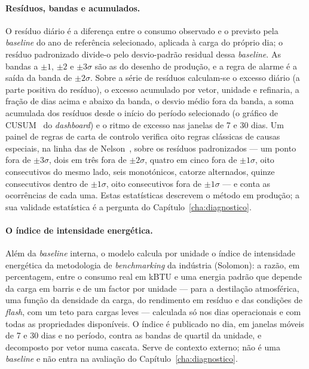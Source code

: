 \paragraph{Resíduos, bandas e acumulados.} O resíduo diário é a diferença
entre o consumo observado e o previsto pela \emph{baseline} do ano de
referência selecionado, aplicada à carga do próprio dia; o resíduo
padronizado divide-o pelo desvio-padrão residual dessa \emph{baseline}. As
bandas a $\pm1$, $\pm2$ e $\pm3\sigma$ são as do desenho de produção, e a
regra de alarme é a saída da banda de $\pm2\sigma$. Sobre a série de
resíduos calculam-se o excesso diário (a parte positiva do resíduo), o
excesso acumulado por vetor, unidade e refinaria, a fração de dias acima
e abaixo da banda, o desvio médio fora da banda, a soma acumulada dos
resíduos desde o início do período selecionado (o gráfico de CUSUM~\cite{Page1954} do
\emph{dashboard}) e o ritmo de excesso nas janelas de 7 e 30 dias. Um
painel de regras de carta de controlo verifica oito regras clássicas de
causas especiais, na linha das de Nelson~\cite{Nelson1984}, sobre os resíduos padronizados --- um ponto fora de $\pm3\sigma$, dois em
três fora de $\pm2\sigma$, quatro em cinco fora de $\pm1\sigma$, oito
consecutivos do mesmo lado, seis monotónicos, catorze alternados, quinze
consecutivos dentro de $\pm1\sigma$, oito consecutivos fora de
$\pm1\sigma$ --- e conta as ocorrências de cada uma. Estas estatísticas
descrevem o método em produção; a sua validade estatística é a pergunta
do Capítulo~\ref{cha:diagnostico}.

\paragraph{O índice de intensidade energética.} Além da \emph{baseline}
interna, o modelo calcula por unidade o índice de intensidade energética
da metodologia de \emph{benchmarking} da indústria (Solomon): a razão,
em percentagem, entre o consumo real em kBTU e uma energia padrão que
depende da carga em barris e de um factor por unidade --- para a
destilação atmosférica, uma função da densidade da carga, do rendimento em
resíduo e das condições de \emph{flash}, com um teto para cargas leves ---
calculada só nos dias operacionais e com todas as propriedades disponíveis.
O índice é publicado no dia, em janelas móveis de 7 e 30 dias e no
período, contra as bandas de quartil da unidade, e decomposto por vetor
numa cascata. Serve de contexto externo; não é uma \emph{baseline} e não
entra na avaliação do Capítulo~\ref{cha:diagnostico}.


